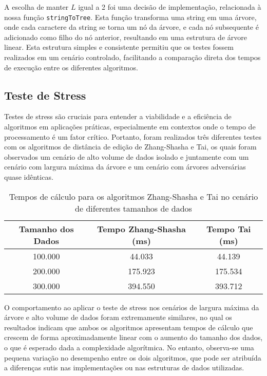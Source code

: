 \documentclass[12pt]{article}
\begin{document}
A escolha de manter \(L\) igual a 2 foi uma decisão de implementação, relacionada à nossa função \texttt{stringToTree}. Esta função transforma uma string em uma árvore, onde cada caractere da string se torna um nó da árvore, e cada nó subsequente é adicionado como filho do nó anterior, resultando em uma estrutura de árvore linear. Esta estrutura simples e consistente permitiu que os testes fossem realizados em um cenário controlado, facilitando a comparação direta dos tempos de execução entre os diferentes algoritmos.

\subsection{Teste de Stress}

Testes de stress são cruciais para entender a viabilidade e a eficiência de algoritmos em aplicações práticas, especialmente em contextos onde o tempo de processamento é um fator crítico. Portanto, foram realizados três diferentes testes com os algoritmos de distância de edição de Zhang-Shasha e Tai, os quais foram observados um cenário de alto volume de dados isolado e juntamente com um cenário com largura máxima da árvore e um cenário com árvores adversárias quase idênticas.

\begin{table}[h]
\centering
\begin{tabular}{|c|c|c|}
\hline
\textbf{Tamanho dos Dados} & \textbf{Tempo Zhang-Shasha (ms)} & \textbf{Tempo Tai (ms)} \\ \hline
100.000                    & 44.033                          & 44.139                 \\ \hline
200.000                    & 175.923                         & 175.534                \\ \hline
300.000                    & 394.550                         & 393.712                \\ \hline
\end{tabular}
\caption{Tempos de cálculo para os algoritmos Zhang-Shasha e Tai no cenário de diferentes tamanhos de dados}
\label{tab:tempos_calculo}
\end{table}

O comportamento ao aplicar o teste de stress nos cenários de largura máxima da árvore e alto volume de dados foram extremamente similares, no qual os resultados  indicam que ambos os algoritmos apresentam tempos de cálculo que crescem de forma aproximadamente linear com o aumento do tamanho dos dados, o que é esperado dada a complexidade algorítmica. No entanto, observa-se uma pequena variação no desempenho entre os dois algoritmos, que pode ser atribuída a diferenças sutis nas implementações ou nas estruturas de dados utilizadas. 
\end{document}
